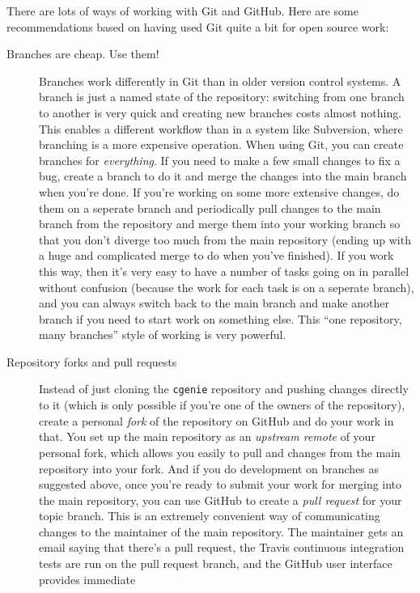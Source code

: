 \documentclass[a4paper,10pt,article]{memoir}
\begin{document}
There are lots of ways of working with Git and GitHub.  Here are some
recommendations based on having used Git quite a bit for open source
work:
\begin{description}
  \item[Branches are cheap.  Use them!]{Branches work differently in
    Git than in older version control systems.  A branch is just a
    named state of the repository: switching from one branch to
    another is very quick and creating new branches costs almost
    nothing.  This enables a different workflow than in a system like
    Subversion, where branching is a more expensive operation.  When
    using Git, you can create branches for \emph{everything}.  If you
    need to make a few small changes to fix a bug, create a branch to
    do it and merge the changes into the main branch when you're done.
    If you're working on some more extensive changes, do them on a
    seperate branch and periodically pull changes to the main branch
    from the repository and merge them into your working branch so
    that you don't diverge too much from the main repository (ending
    up with a huge and complicated merge to do when you've finished).
    If you work this way, then it's very easy to have a number of
    tasks going on in parallel without confusion (because the work for
    each task is on a seperate branch), and you can always switch back
    to the main branch and make another branch if you need to start
    work on something else.  This ``one repository, many branches''
    style of working is very powerful.}
  \item[Repository forks and pull requests]{Instead of just cloning
    the \texttt{cgenie} repository and pushing changes directly to it
    (which is only possible if you're one of the owners of the
    repository), create a personal \emph{fork} of the repository on
    GitHub and do your work in that.  You set up the main repository
    as an \emph{upstream remote} of your personal fork, which allows
    you easily to pull and changes from the main repository into your
    fork.  And if you do development on branches as suggested above,
    once you're ready to submit your work for merging into the main
    repository, you can use GitHub to create a \emph{pull request} for
    your topic branch.  This is an extremely convenient way of
    communicating changes to the maintainer of the main repository.
    The maintainer gets an email saying that there's a pull request,
    the Travis continuous integration tests are run on the pull
    request branch, and the GitHub user interface provides immediate
}
\end{description}
\end{document}
